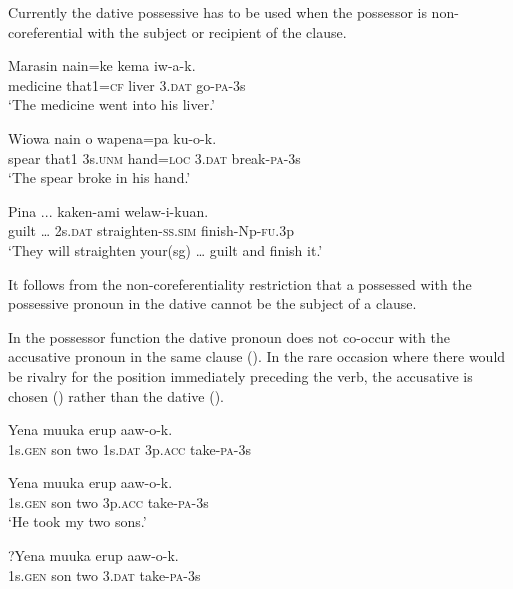 Currently the dative possessive has to be used when the possessor is non-coreferential with the subject or recipient of the clause.

\ea%
\label{ex:x588}
\gll Marasin nain=ke kema  iw-a-k. \\
medicine that1=\textsc{cf} liver 3.\textsc{dat} go-\textsc{pa}-3s\\
\glt`The medicine went into his liver.'
\z

\ea%
\label{ex:x853}
\gll Wiowa nain o wapena=pa   ku-o-k. \\
spear that1 3s.\textsc{unm} hand=\textsc{loc} 3.\textsc{dat} break-\textsc{pa}-3s\\
\glt`The spear broke in his hand.'
\z

\ea%
\label{ex:x1794}
\gll Pina ...  kaken-ami welaw-i-kuan. \\
guilt {\dots} 2s.\textsc{dat} straighten-\textsc{ss}.\textsc{sim} finish-Np-\textsc{fu}.3p\\
\glt`They will straighten your(sg) {\dots} guilt and finish it.'
\z

It follows from the non-coreferentiality restriction that a possessed  with the possessive pronoun in the dative cannot be the subject of a clause. 

In the possessor function the dative pronoun does not co-occur with the accusative pronoun in the same clause (). In the rare occasion where there would be rivalry for the position immediately preceding the verb, the accusative is chosen () rather than the dative (). 

\ea%
\label{ex:x584}
\gll *Yena muuka erup   aaw-o-k. \\
1s.\textsc{gen} son two 1s.\textsc{dat} 3p.\textsc{acc} take-\textsc{pa}-3s\\
\glt %
\z

\ea%
\label{ex:x583}
\gll Yena muuka erup  aaw-o-k. \\
1s.\textsc{gen} son two 3p.\textsc{acc} take-\textsc{pa}-3s\\
\glt`He took my two sons.'
\z

\ea%
\label{ex:x1928}
\gll ?Yena muuka erup  aaw-o-k. \\
1s.\textsc{gen} son two 3.\textsc{dat} take-\textsc{pa}-3s\\
\glt %
\z

